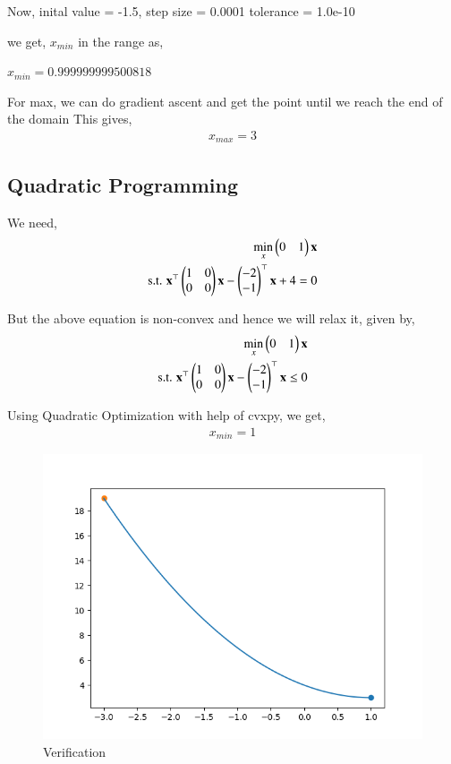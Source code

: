 \documentclass[journal]{IEEEtran}
\begin{document}
Now,
inital value = -1.5,
step size = 0.0001
tolerance = 1.0e-10

we get, $x_{min}$ in the range as,

$x_{min} = 0.999999999500818$

For max, we can do gradient ascent and get the point until we reach the end of the domain
This gives,
\begin{align}
    x_{max} = 3    
\end{align}

\subsection{Quadratic Programming}
    We need,
    \begin{align}
        \min_{x} \begin{pmatrix}0 & 1\end{pmatrix}\mathbf{x}\\
        \text{s.t. } \mathbf{x}^\top\begin{pmatrix}1 & 0\\0 & 0\end{pmatrix}\mathbf{x} -\begin{pmatrix}-2 \\ -1\end{pmatrix}^\top\mathbf{x} + 4 = 0
    \end{align}

    But the above equation is non-convex and hence we will relax it, given by,
    \begin{align}
        \min_{x} \begin{pmatrix}0 & 1\end{pmatrix}\mathbf{x}\\
        \text{s.t. }\mathbf{x}^\top\begin{pmatrix}1 & 0\\0 & 0\end{pmatrix}\mathbf{x} - \begin{pmatrix}-2\\-1\end{pmatrix}^\top\mathbf{x} \leq 0
    \end{align}

    Using Quadratic Optimization with help of cvxpy, we get,
    \begin{align}
        x_{min} = 1
    \end{align}

\begin{figure}[ht]  
    \centering  
    \includegraphics[width=\columnwidth]{figs/fig2.png}  
    \caption{Verification}
\end{figure}
    
\end{document}
